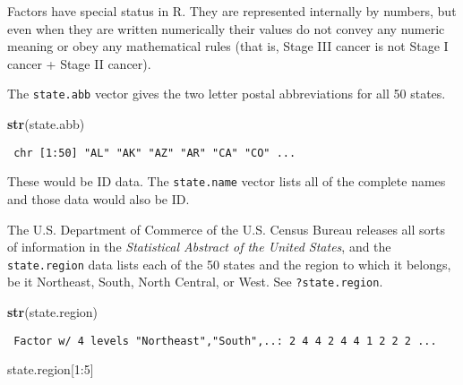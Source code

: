 \documentclass[]{book}
\newenvironment{Shaded}{\begin{snugshade}}{\end{snugshade}}
\newcommand{\KeywordTok}[1]{\textcolor[rgb]{0.13,0.29,0.53}{\textbf{{#1}}}}
\newcommand{\DecValTok}[1]{\textcolor[rgb]{0.00,0.00,0.81}{{#1}}}
\newcommand{\NormalTok}[1]{{#1}}
\numberwithin{equation}{chapter}
\numberwithin{figure}{chapter}
\theoremstyle{plain}
\theoremstyle{definition}
\theoremstyle{remark}
\theoremstyle{definition}
\theoremstyle{definition}
\theoremstyle{remark}
\let\BeginKnitrBlock\begin \let\EndKnitrBlock\end
\begin{document}
Factors have special status in R. They are represented internally by
numbers, but even when they are written numerically their values do not
convey any numeric meaning or obey any mathematical rules (that is,
Stage III cancer is not Stage I cancer + Stage II cancer).

\bigskip

\BeginKnitrBlock{example}
\protect\hypertarget{ex:unnamed-chunk-40}{}{\label{ex:unnamed-chunk-40}}The
\texttt{state.abb}  vector
gives the two letter postal abbreviations for all 50 states.
\EndKnitrBlock{example}

\begin{Shaded}
\begin{Highlighting}[]
\KeywordTok{str}\NormalTok{(state.abb)}
\end{Highlighting}
\end{Shaded}

\begin{verbatim}
 chr [1:50] "AL" "AK" "AZ" "AR" "CA" "CO" ...
\end{verbatim}

These would be ID data. The \texttt{state.name}  vector lists all of the complete
names and those data would also be ID.

\bigskip

\BeginKnitrBlock{example}[U.S. State Facts and Features]
\protect\hypertarget{ex:unnamed-chunk-42}{}{\label{ex:unnamed-chunk-42}
\iffalse (U.S. State Facts and Features) \fi }The U.S. Department of
Commerce of the U.S. Census Bureau releases all sorts of information in
the \emph{Statistical Abstract of the United States}, and the
\texttt{state.region}  data lists each of the 50
states and the region to which it belongs, be it Northeast, South, North
Central, or West. See \texttt{?state.region}.
\EndKnitrBlock{example}

\begin{Shaded}
\begin{Highlighting}[]
\KeywordTok{str}\NormalTok{(state.region)}
\end{Highlighting}
\end{Shaded}

\begin{verbatim}
 Factor w/ 4 levels "Northeast","South",..: 2 4 4 2 4 4 1 2 2 2 ...
\end{verbatim}

\begin{Shaded}
\begin{Highlighting}[]
\NormalTok{state.region[}\DecValTok{1}\NormalTok{:}\DecValTok{5}\NormalTok{]}
\end{Highlighting}
\end{Shaded}
\end{document}
